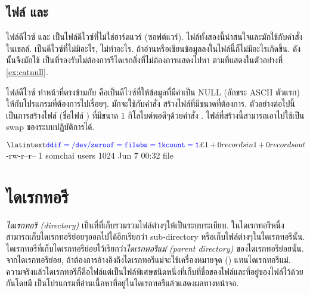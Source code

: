 \begin{thwbr}
\subsection{ไฟล์  และ }
ไฟล์ดีไวซ์  และ  เป็นไฟล์ดีไวซ์ที่ไม่ใช่ฮาร์ดแวร์ (ซอฟต์แวร์). ไฟล์ทั้งสองนี้น่าสนใจและมักใช้กับคำสั่งในเชลล์.  เป็นดีไวซ์ที่ไม่มีอะไร, ไม่ทำอะไร. ถ้าอ่านหรือเขียนข้อมูลลงในไฟล์นี้ก็ไม่มีอะไรเกิดขึ้น. ดังนั้นจึงมักใช้  เป็นที่รองรับไม่ต้องการรีไดเรกสิ่งที่ไม่ต้องการแสดงไปหา  ตามที่แสดงในตัวอย่างที่ \ref{ex:catnull}.

ไฟล์ดีไวซ์  ทำหน้าที่ตรงข้ามกับ  คือเป็นดีไวซ์ที่ให้ข้อมูลที่มีค่าเป็น NULL (อักขระ ASCII ตัวแรก) ให้กับโปรแกรมที่ต้องการไปเรื่อยๆ. มักจะใช้กับคำสั่ง  สร้างไฟล์ที่มีขนาดที่ต้องการ. ตัวอย่างต่อไปนี้เป็นการสร้างไฟล์ (ชื่อไฟล์ ) ที่มีขนาด 1 กิโลไบต์พอดีๆด้วยคำสั่ง . ไฟล์ที่สร้างนี้สามารถเอาไปใช้เป็น swap ของระบบปฏิบัติการได้.
\begin{MyExample}\label{ex:dd}
\begin{MyEx}
$ \cin{dd if=/dev/zero of=file bs=1k count=1}
1+0 records in
1+0 records out
$ 
-rw-r--r--    1 somchai  users        1024 Jun  7 00:32 file
\end{MyEx}
\end{MyExample}


\section{ไดเรกทอรี}
\begin{figure}[!htb]
\end{figure}
\emph{ไดเรกทอรี (directory)} เป็นที่ที่เก็บรวมรวมไฟล์ต่างๆให้เป็นระบบระเบียบ. ในไดเรกทอรีหนึ่งสามารถเก็บไดเรกทอรีย่อยๆออกไปได้อีกเรียกว่า sub-directory หรือเก็บไฟล์ต่างๆในไดเรกทอรีนั้น. ไดเรกทอรีที่เก็บไดเรกทอรีย่อยไว้เรียกว่า\emph{ไดเรกทอรีแม่ (parent directory)} ของไดเรกทอรีย่อยนั้น. จากไดเรกทอรีย่อย, ถ้าต้องการอ้างอิงถึงไดเรกทอรีแม่จะใช้เครื่องหมายจุด () แทนไดเรกทอรีแม่. ความจริงแล้วไดเรกทอรีก็คือไฟล์แต่เป็นไฟล์พิเศษชนิดหนึ่งที่เก็บที่ชื่อของไฟล์และที่อยู่ของไฟล์ไว้ด้วยกันโดยมี  เป็นโปรแกรมที่อ่านเนื้อหาที่อยู่ในไดเรกทอรีแล้วแสดงผลทางหน้าจอ. 





\end{thwbr}
